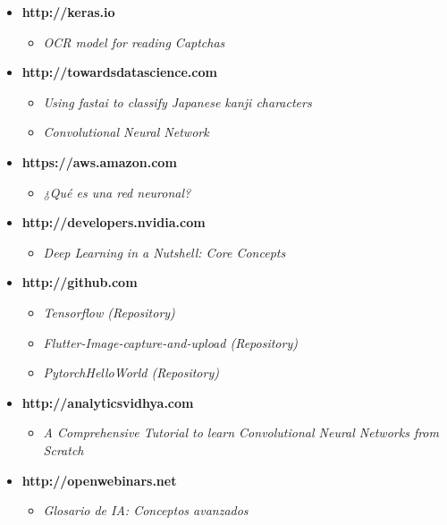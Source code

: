 \documentclass{article}
\begin{document}
\begin{spacing}{0.05}
\begin{small}
\begin{itemize}
        \item \textbf{http://keras.io}
            \begin{itemize}
                \item \textit{OCR model for reading Captchas}
            \end{itemize}

        \item \textbf{http://towardsdatascience.com}
            \begin{itemize}
                \item \textit{Using fastai to classify Japanese kanji characters}
                \item \textit{Convolutional Neural Network}
            \end{itemize}

        \item \textbf{https://aws.amazon.com}
            \begin{itemize}
                \item \textit{¿Qué es una red neuronal?}
            \end{itemize}

        \item \textbf{http://developers.nvidia.com}
            \begin{itemize}
                \item \textit{Deep Learning in a Nutshell: Core Concepts}
            \end{itemize}

        \item \textbf{http://github.com}
            \begin{itemize}
                \item \textit{Tensorflow (Repository)}
                \item \textit{Flutter-Image-capture-and-upload (Repository)}
                \item \textit{PytorchHelloWorld (Repository)}
            \end{itemize}

        \item \textbf{http://analyticsvidhya.com}
            \begin{itemize}
                \item \textit{A Comprehensive Tutorial to learn Convolutional Neural Networks from Scratch}
            \end{itemize}

        \item \textbf{http://openwebinars.net}
            \begin{itemize}
                \item \textit{Glosario de IA: Conceptos avanzados}
            \end{itemize}

    \end{itemize}

\end{small}
\end{spacing}
\end{document}
